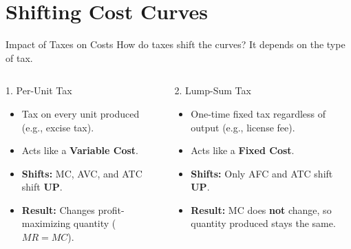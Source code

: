 \documentclass[aspectratio=169]{beamer}
\begin{document}
\section{Shifting Cost Curves}

\begin{frame}{Impact of Taxes on Costs}
    How do taxes shift the curves? It depends on the type of tax.
    
    \vspace{0.5cm}
    
    \begin{columns}
        \begin{block}{1. Per-Unit Tax}
            \begin{itemize}
                \item Tax on every unit produced (e.g., excise tax).
                \item Acts like a \textbf{Variable Cost}.
                \item \textbf{Shifts:} MC, AVC, and ATC shift \textbf{UP}.
                \item \textbf{Result:} Changes profit-maximizing quantity ($MR=MC$).
            \end{itemize}
        \end{block}
        
        \begin{block}{2. Lump-Sum Tax}
            \begin{itemize}
                \item One-time fixed tax regardless of output (e.g., license fee).
                \item Acts like a \textbf{Fixed Cost}.
                \item \textbf{Shifts:} Only AFC and ATC shift \textbf{UP}.
                \item \textbf{Result:} MC does \textbf{not} change, so quantity produced stays the same.
            \end{itemize}
        \end{block}
    \end{columns}
\end{frame}

\end{document}
